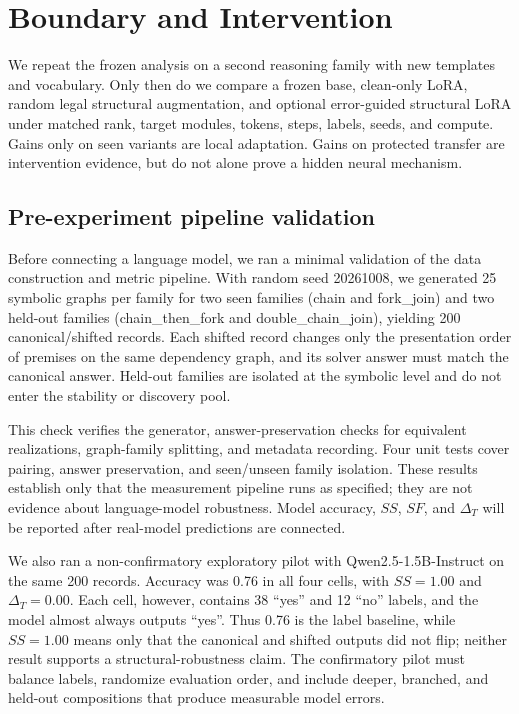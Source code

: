 \documentclass[11pt,a4paper]{article}
\theoremstyle{plain}
\begin{document}
\section{Boundary and Intervention}

We repeat the frozen analysis on a second reasoning family with new templates
and vocabulary. Only then do we compare a frozen base, clean-only LoRA, random
legal structural augmentation, and optional error-guided structural LoRA under
matched rank, target modules, tokens, steps, labels, seeds, and compute. Gains
only on seen variants are local adaptation. Gains on protected transfer are
intervention evidence, but do not alone prove a hidden neural mechanism.

\subsection{Pre-experiment pipeline validation}

Before connecting a language model, we ran a minimal validation of the data
construction and metric pipeline. With random seed 20261008, we generated 25
symbolic graphs per family for two seen families (chain and fork\_join) and two
held-out families (chain\_then\_fork and double\_chain\_join), yielding 200
canonical/shifted records. Each shifted record changes only the presentation
order of premises on the same dependency graph, and its solver answer must
match the canonical answer. Held-out families are isolated at the symbolic
level and do not enter the stability or discovery pool.

This check verifies the generator, answer-preservation checks for equivalent
realizations, graph-family splitting, and metadata recording. Four unit tests
cover pairing, answer preservation, and seen/unseen family isolation. These
results establish only that the measurement pipeline runs as specified; they
are not evidence about language-model robustness. Model accuracy, $SS$, $SF$,
and $\Delta_T$ will be reported after real-model predictions are connected.

We also ran a non-confirmatory exploratory pilot with Qwen2.5-1.5B-Instruct on
the same 200 records. Accuracy was 0.76 in all four cells, with $SS=1.00$ and
$\Delta_T=0.00$. Each cell, however, contains 38 ``yes'' and 12 ``no'' labels,
and the model almost always outputs ``yes''. Thus 0.76 is the label baseline,
while $SS=1.00$ means only that the canonical and shifted outputs did not flip;
neither result supports a structural-robustness claim. The confirmatory pilot
must balance labels, randomize evaluation order, and include deeper, branched,
and held-out compositions that produce measurable model errors.
\end{document}
